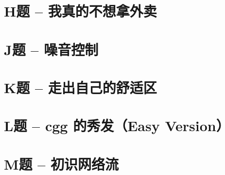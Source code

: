 \documentclass{math}
\begin{document}
\section{H题 -- 我真的不想拿外卖}


\section{J题 -- 噪音控制}


\section{K题 -- 走出自己的舒适区}


\section{L题 -- cgg 的秀发（Easy Version）}


\section{M题 -- 初识网络流}

\end{document}
